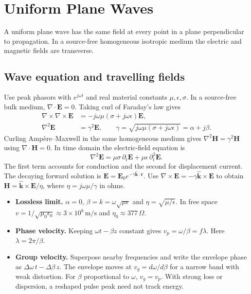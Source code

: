 \documentclass[12pt,a4paper]{article}
\begin{document}
\section{Uniform Plane Waves}
\begin{tcolorbox}[defbox,title={Uniform plane wave}]
A uniform plane wave has the same field at every point in a plane perpendicular to propagation. In a source-free homogeneous isotropic medium the electric and magnetic fields are transverse.
\end{tcolorbox}
\subsection{Wave equation and travelling fields}
Use peak phasors with $e^{j\omega t}$ and real material constants $\mu,\epsilon,\sigma$. In a source-free bulk medium, $\nabla\cdot\mathbf E=0$. Taking curl of Faraday's law gives
\[
\begin{aligned}
\nabla\times\nabla\times\mathbf E
 &=-j\omega\mu(\sigma+j\omega\epsilon)\mathbf E,\\
\nabla^2\mathbf E&=\gamma^2\mathbf E,\qquad
\gamma=\sqrt{j\omega\mu(\sigma+j\omega\epsilon)}=\alpha+j\beta .
\end{aligned}
\]
Curling Amp\`ere--Maxwell in the same homogeneous medium gives $\nabla^2\mathbf H=\gamma^2\mathbf H$ using $\nabla\cdot\mathbf H=0$. In time domain the electric-field equation is
\[
 \nabla^2\mathbf E=\mu\sigma\,\partial_t\mathbf E+
                      \mu\epsilon\,\partial_t^2\mathbf E.
\]
The first term accounts for conduction and the second for displacement current.
The decaying forward solution is $\mathbf E=\mathbf E_0e^{-\gamma\hat{\mathbf k}\cdot\mathbf r}$. Use $\nabla\times\mathbf E=-\gamma\hat{\mathbf k}\times\mathbf E$ to obtain $\mathbf H=\hat{\mathbf k}\times\mathbf E/\eta$, where $\eta=j\omega\mu/\gamma$ in ohms.
\begin{itemize}[leftmargin=*,itemsep=3pt]
\item \textbf{Lossless limit.} $\alpha=0$, $\beta=k=\omega\sqrt{\mu\epsilon}$ and $\eta=\sqrt{\mu/\epsilon}$. In free space $v=1/\sqrt{\mu_0\epsilon_0}\approx 3\times10^8\,\mathrm{m/s}$ and $\eta_0\approx377\,\Omega$.
\item \textbf{Phase velocity.} Keeping $\omega t-\beta z$ constant gives $v_p=\omega/\beta=f\lambda$. Here $\lambda=2\pi/\beta$.
\item \textbf{Group velocity.} Superpose nearby frequencies and write the envelope phase as $\Delta\omega\,t-\Delta\beta\,z$. The envelope moves at $v_g=d\omega/d\beta$ for a narrow band with weak distortion. For $\beta$ proportional to $\omega$, $v_g=v_p$. With strong loss or dispersion, a reshaped pulse peak need not track energy.
\end{itemize}
\end{document}
